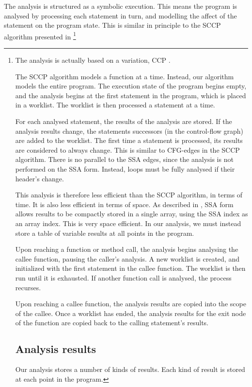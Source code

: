 The analysis is structured as a symbolic execution.
This means the program is analysed by processing each statement in turn, and modelling the affect of the statement on the program state.
This is similar in principle to the SCCP algorithm presented in \footnote{The analysis is actually based on a variation, CCP \cite{pioli}.

The SCCP algorithm models a function at a time.
Instead, our algorithm models the entire program.
The execution state of the program begins empty, and the analysis begins at the first statement in the program, which is placed in a worklist.
The worklist is then processed a statement at a time.

For each analysed statement, the results of the analysis are stored.
If the analysis results change, the statements successors (in the control-flow graph) are added to the worklist.
The first time a statement is processed, its results are considered to always change.
This is similar to CFG-edges in the SCCP algorithm.
There is no parallel to the SSA edges, since the analysis is not performed on the SSA form.
Instead, loops must be fully analysed if their header's change.

This analysis is therefore less efficient than the SCCP algorithm, in terms of time.
It is also less efficient in terms of space.
As described in , SSA form allows results to be compactly stored in a single array, using the SSA index as an array index.
This is very space efficient.
In our analysis, we must instead store a table of variable results at all points in the program.

Upon reaching a function or method call, the analysis begins analysing the callee function, pausing the caller's analysis.
A new worklist is created, and initialized with the first statement in the callee function.
The worklist is then run until it is exhausted.
If another function call is analysed, the process recurses.

Upon reaching a callee function, the analysis results are copied into the scope of the callee.
Once a worklist has ended, the analysis results for the exit node of the function are copied back to the calling statement's results.

\subsection{Analysis results}

Our analysis stores a number of kinds of results.
Each kind of result is stored at each point in the program.

}
